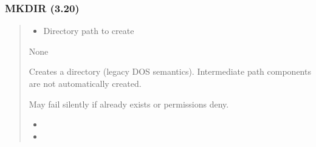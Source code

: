 \documentclass[letterpaper,10pt,english]{sphinxmanual}
\begin{document}
\subsubsection{MKDIR (3.20)}
\label{\detokenize{ppl:mkdir-3-20}}\begin{quote}

\sphinxAtStartPar
{}
\begin{description}
\begin{itemize}
\item {} 
\sphinxAtStartPar
{} \textendash{} Directory path to create

\end{itemize}

\sphinxAtStartPar
None

\sphinxAtStartPar
Creates a directory (legacy DOS semantics). Intermediate path components are not automatically created.

\end{description}

\sphinxAtStartPar
{}
\begin{quote}

\begin{sphinxVerbatim}[commandchars=\\\{\}]
 
\end{sphinxVerbatim}
\end{quote}
\begin{description}
\sphinxAtStartPar
May fail silently if already exists or permissions deny.

\begin{itemize}
\item {} 
\sphinxAtStartPar
{}

\item {} 
\sphinxAtStartPar
{}

\end{itemize}

\end{description}
\end{quote}
\end{document}
